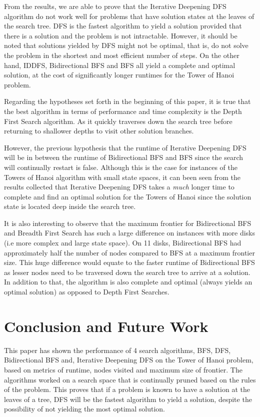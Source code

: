 \documentclass[conference]{IEEEtran}
\begin{document}
From the results, we are able to prove that the Iterative Deepening DFS algorithm do not work well for problems that have solution states at the leaves of the search tree. DFS is the fastest algorithm to yield a solution provided that there is a solution and the problem is not intractable. However, it should be noted that solutions yielded by DFS might not be optimal, that is, do not solve the problem in the shortest and most efficient number of steps. On the other hand, IDDFS, Bidirectional BFS and BFS all yield a complete and optimal solution, at the cost of significantly longer runtimes for the Tower of Hanoi problem.

Regarding the hypotheses set forth in the beginning of this paper, it is true that the best algorithm in terms of performance and time complexity is the Depth First Search algorithm. As it quickly traverses down the search tree before returning to shallower depths to visit other solution branches. 

However, the previous hypothesis that the runtime of Iterative Deepening DFS will be in between the runtime of Bidirectional BFS and BFS since the search will continually restart is false. Although this is the case for instances of the Towers of Hanoi algorithm with small state spaces, it can been seen from the results collected that Iterative Deepening DFS takes a \textit{much} longer time to complete and find an optimal solution for the Towers of Hanoi since the solution state is located deep inside the search tree.

It is also interesting to observe that the maximum frontier for Bidirectional BFS and Breadth First Search has such a large difference on instances with more disks (i.e more complex and large state space). On 11 disks, Bidirectional BFS had approximately half the number of nodes compared to BFS at a maximum frontier size. This huge difference would equate to the faster runtime of Bidirectional BFS as lesser nodes need to be traversed down the search tree to arrive at a solution. In addition to that, the algorithm is also complete and optimal (always yields an optimal solution) as opposed to Depth First Searches.

\section{Conclusion and Future Work}

This paper has shown the performance of 4 search algorithms, BFS, DFS, Bidirectional BFS and, Iterative Deepening DFS on the Tower of Hanoi problem, based on metrics of runtime, nodes visited and maximum size of frontier. The algorithms worked on a search space that is continually pruned based on the rules of the problem. This proves that if a problem is known to have a solution at the leaves of a tree, DFS will be the fastest algorithm to yield a solution, despite the possibility of not yielding the most optimal solution. 
\end{document}
